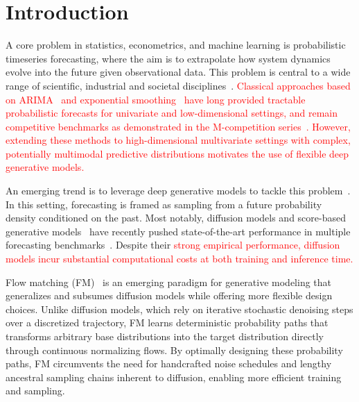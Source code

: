 \documentclass[a4paper,10pt,twocolumn,preprint,3p]{elsarticle}
\begin{document}
\section{Introduction}
\label{sec:Introduction}
A core problem in statistics, econometrics, and machine learning is probabilistic timeseries forecasting, where the aim is to extrapolate how system dynamics evolve into the future given observational data. This problem is central to a wide range of scientific, industrial and societal disciplines~\citep{Lim2021Timeseries,Dama2021Timeseries,Liang2024Survey}. \textcolor{red}{Classical approaches based on ARIMA~\citep{Box1994Timeseries} and exponential smoothing~\citep{hyndman2008forecasting} have long provided tractable probabilistic forecasts for univariate and low-dimensional settings, and remain competitive benchmarks as demonstrated in the M-competition series~\citep{makridakis2020m4}. However, extending these methods to high-dimensional multivariate settings with complex, potentially multimodal predictive distributions motivates the use of flexible deep generative models.}

An emerging trend is to leverage deep generative models to tackle this problem~\citep{karl2016deep, rasul2020multivariate, desai2021timevae}. In this setting, forecasting is framed as sampling from a future probability density conditioned on the past. Most notably, diffusion models and score-based generative models~\citep{sohl2015deep, ho2020denoising, song2020score} have recently pushed state-of-the-art performance in multiple forecasting benchmarks~\citep{rasul2021autoregressive, tashiro2021csdi, kollovieh2023predict, meijer2024rise}. Despite their \textcolor{red}{strong empirical performance, diffusion models incur substantial computational costs at both training and inference time.}

Flow matching (FM)~\citep{liu2022flow, albergo2023stochastic, Lipman2022} is an emerging paradigm for generative modeling that generalizes and subsumes diffusion models while offering more flexible design choices. Unlike diffusion models, which rely on iterative stochastic denoising steps over a discretized trajectory, FM learns deterministic probability paths that transforms arbitrary base distributions into the target distribution directly through continuous normalizing flows. By optimally designing these probability paths, FM circumvents the need for handcrafted noise schedules and lengthy ancestral sampling chains inherent to diffusion, enabling more efficient training and sampling. 
\end{document}
